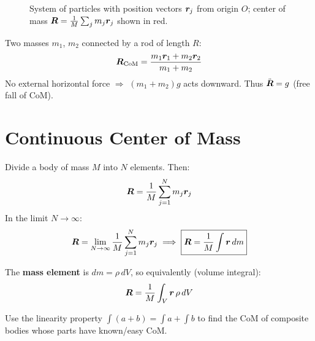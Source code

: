 \begin{figure}[H]
\begin{center}
\end{center}
\caption{System of particles with position vectors $\bm{r}_j$ from origin $O$; center of mass $\vect{R} = \frac{1}{M}\sum_j m_j \lvect{r}_j$ shown in red.}
\label{fig:com_particles}
\end{figure}

\begin{example}
Two masses $m_1$, $m_2$ connected by a rod of length $R$:
\[
    \vect{R}_{\text{CoM}} = \frac{m_1\lvect{r}_1 + m_2\lvect{r}_2}{m_1 + m_2}
\]
No external horizontal force $\Rightarrow$ $(m_1 + m_2)g$ acts downward. Thus $\ddot{\vect{R}} = g$ (free fall of CoM).
\end{example}

\section{Continuous Center of Mass}

Divide a body of mass $M$ into $N$ elements. Then:
\[
    \vect{R} = \frac{1}{M}\sum_{j=1}^{N} m_j \lvect{r}_j
\]
In the limit $N \to \infty$:
\[
    \vect{R} = \lim_{N\to\infty} \frac{1}{M}\sum_{j=1}^{N} m_j \lvect{r}_j \implies \boxed{\vect{R} = \frac{1}{M}\int \lvect{r}\,dm}
\]

The \textbf{mass element} is $dm = \rho\,dV$, so equivalently (volume integral):
\[
    \vect{R} = \frac{1}{M}\int_V \lvect{r}\,\rho\,dV
\]

Use the linearity property $\int(a+b) = \int a + \int b$ to find the CoM of composite bodies whose parts have known/easy CoM.

